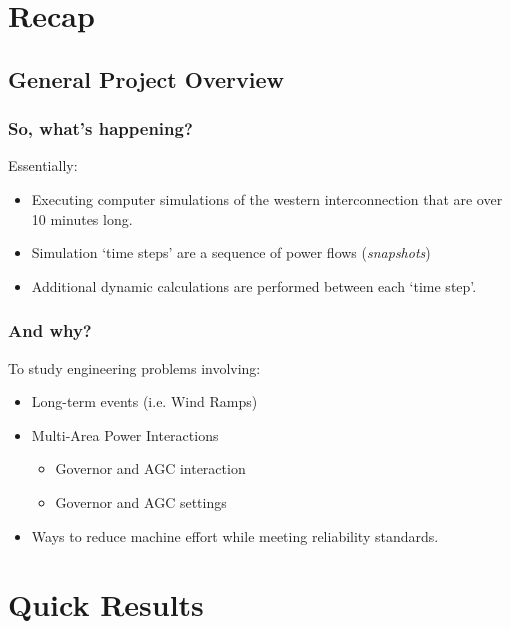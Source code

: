 \documentclass[14pt, unknownkeysallowed]{beamer}
\begin{document}
\section{Recap}
\subsection{General Project Overview}
\begin{frame}
\frametitle{So, what's happening?}
Essentially:
\begin{itemize}
	\item Executing computer simulations of the western interconnection that are  over 10 minutes long.
	\item Simulation `time steps' are a sequence of power flows (\emph{snapshots})
	\item Additional dynamic calculations are performed between each `time step'.
\end{itemize}

\end{frame}
\begin{frame}
\frametitle{And why?}
To study engineering problems involving:
\begin{itemize}
	\item Long-term events (i.e. Wind Ramps)
	\item Multi-Area Power Interactions
	\begin{itemize}
		\item Governor and AGC interaction
		\item Governor and AGC settings		
	\end{itemize}
	\item Ways to reduce machine effort while meeting reliability standards.
\end{itemize}
\end{frame}
\section{Quick Results}
\end{document}
